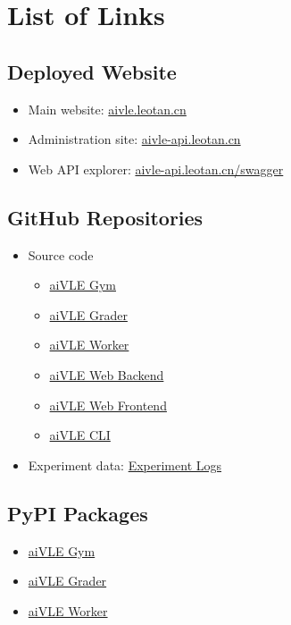 \chapter{List of Links}
\label{appendix:links}

\section{Deployed Website}
\begin{itemize}
    \item Main website: \href{https://aivle.leotan.cn/}{aivle.leotan.cn}
    \item Administration site: \href{https://aivle-api.leotan.cn/api/v1/}{aivle-api.leotan.cn}
    \item Web API explorer: \href{https://aivle-api.leotan.cn/swagger/}{aivle-api.leotan.cn/swagger}
\end{itemize}

\section{GitHub Repositories}
\label{as:links-source_code}
\begin{itemize}
    \item Source code
    \begin{itemize}
        \item \href{https://github.com/edu-ai/aivle-gym}{aiVLE Gym}
        \item \href{https://github.com/edu-ai/aivle-grader}{aiVLE Grader}
        \item \href{https://github.com/edu-ai/aivle-worker}{aiVLE Worker}
        \item \href{https://github.com/edu-ai/aivle-web}{aiVLE Web Backend}
        \item \href{https://github.com/le0tan/aivle-fe}{aiVLE Web Frontend}
        \item \href{https://github.com/edu-ai/aivle-cli}{aiVLE CLI}
    \end{itemize}
    \item Experiment data: \href{https://github.com/edu-ai/aivle-experiment-logs}{Experiment Logs}
\end{itemize}

\section{PyPI Packages}
\begin{itemize}
    \item \href{https://test.pypi.org/project/aivle-gym/}{aiVLE Gym}
    \item \href{https://test.pypi.org/project/aivle-grader/}{aiVLE Grader}
    \item \href{https://test.pypi.org/project/aivle-worker/}{aiVLE Worker}
\end{itemize}

